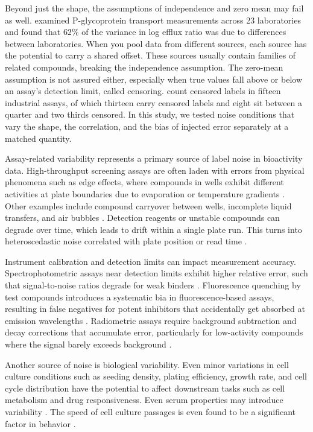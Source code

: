 Beyond just the shape, the assumptions of independence and zero mean may fail as well. \citet{Bentz2013} examined P-glycoprotein transport measurements across 23 laboratories and found that $62\%$ of the variance in log efflux ratio was due to differences between laboratories. When you pool data from different sources, each source has the potential to carry a shared offset. These sources usually contain families of related compounds, breaking the independence assumption. The zero-mean assumption is not assured either, especially when true values fall above or below an assay's detection limit, called censoring. \citet{Svensson2025} count censored labels in fifteen industrial assays, of which thirteen carry censored labels and eight sit between a quarter and two thirds censored. In this study, we tested noise conditions that vary the shape, the correlation, and the bias of injected error separately at a matched quantity.  

Assay-related variability represents a primary source of label noise in bioactivity data. High-throughput screening assays are often laden with errors from physical phenomena such as edge effects, where compounds in wells exhibit different activities at plate boundaries due to evaporation or temperature gradients \citep{Macarron2011}. Other examples include compound carryover between wells, incomplete liquid transfers, and air bubbles  \citep{Inglese2006}.  Detection reagents or unstable compounds can degrade over time, which leads to drift within a single plate run. This turns into heteroscedastic noise correlated with plate position or read time \citep{Brideau2003}.

Instrument calibration and detection limits can impact measurement accuracy. Spectrophotometric assays near detection limits exhibit higher relative error, such that signal-to-noise ratios degrade for weak binders \citep{Zhang1999}. Fluorescence quenching by test compounds introduces a systematic bia in fluorescence-based assays, resulting in false negatives for potent inhibitors that accidentally get absorbed at emission wavelengths \citep{Simeonov2008}. Radiometric assays require background subtraction and decay corrections that accumulate error, particularly for low-activity compounds where the signal barely exceeds background \citep{Zhang1999}.

Another source of noise is biological variability. Even minor variations in cell culture conditions such as seeding density, plating efficiency, growth rate, and cell cycle distribution have the potential to affect downstream tasks such as cell metabolism and drug responsiveness. Even serum properties may introduce variability \citep{Hatzis2014}. The speed of cell culture passages is even found to be a significant factor in behavior \citep{Postnikova2018}. 

